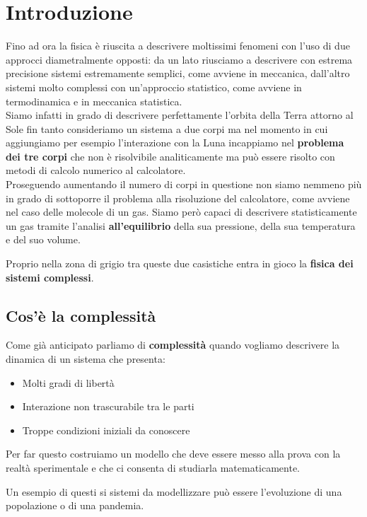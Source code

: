\section{Introduzione}

Fino ad ora la fisica è riuscita a descrivere moltissimi fenomeni con l'uso di due approcci diametralmente opposti: da un lato riusciamo a descrivere con estrema precisione sistemi estremamente semplici, come avviene in meccanica, dall'altro sistemi molto complessi con un'approccio statistico, come avviene in termodinamica e in meccanica statistica. \\

Siamo infatti in grado di descrivere perfettamente l'orbita della Terra attorno al Sole fin tanto consideriamo un sistema a due corpi ma nel momento in cui aggiungiamo per esempio l'interazione con la Luna incappiamo nel \textbf{problema dei tre corpi} che non è risolvibile analiticamente ma può essere risolto con metodi di calcolo numerico al calcolatore.\\

Proseguendo aumentando il numero di corpi in questione non siamo nemmeno più in grado di sottoporre il problema alla risoluzione del calcolatore, come avviene nel caso delle molecole di un gas. Siamo però capaci di descrivere statisticamente un gas tramite l'analisi \textbf{all'equilibrio} della sua pressione, della sua temperatura e del suo volume. 

Proprio nella zona di grigio tra queste due casistiche entra in gioco la \textbf{fisica dei sistemi complessi}.
\subsection{Cos'è la complessità}

Come già anticipato parliamo di \textbf{complessità} quando vogliamo descrivere la dinamica di un sistema che presenta:

\begin{itemize}
	\item Molti gradi di libertà
	\item Interazione non trascurabile tra le parti
	\item Troppe condizioni iniziali da conoscere 
\end{itemize}

Per far questo costruiamo un modello che deve essere messo alla prova con la realtà sperimentale e che ci consenta di studiarla matematicamente.

Un esempio di questi si sistemi da modellizzare può essere l'evoluzione di una popolazione o di una pandemia.
